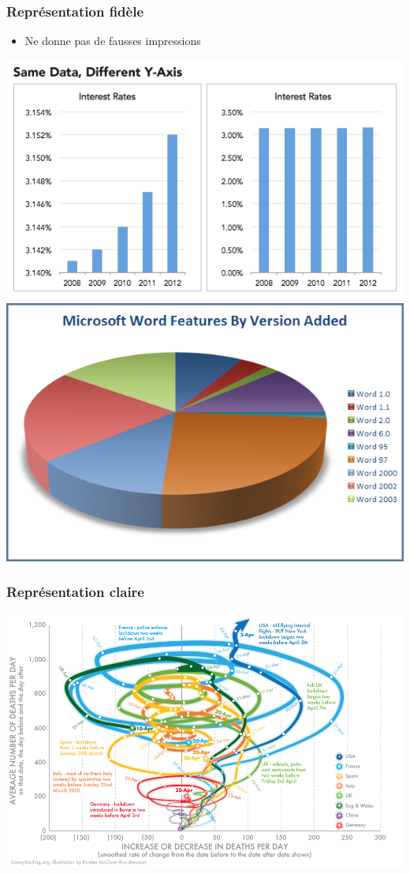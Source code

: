 \documentclass[aspectratio=169]{beamer}
\begin{document}
\begin{frame}[c]\frametitle{Représentation fidèle}
    

\begin{itemize}
	\item Ne donne pas de fausses impressions
\end{itemize}

\begin{center}
\includegraphics[width=.4\textwidth]{figures/misleading_chart.png}
\hspace{1cm}
\includegraphics[width=.4\textwidth]{figures/misleading-pie-chart.png}
\end{center}

\end{frame}





\begin{frame}[c]\frametitle{Représentation claire}
    
\begin{center}
\includegraphics[scale=.25]{figures/unclear-chart.png} 
\end{center}

\end{frame}
\end{document}
